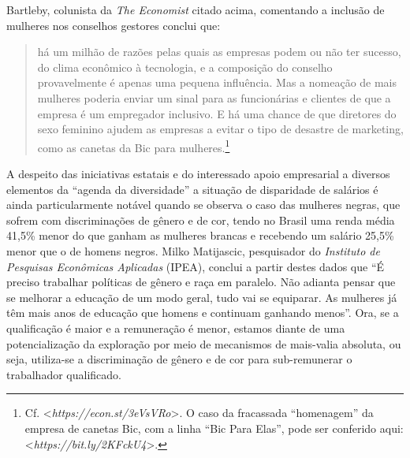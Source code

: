 Bartleby, colunista da \emph{The Economist} citado acima, comentando a
inclusão de mulheres nos conselhos gestores conclui que:

\begin{quote}
há um milhão de razões pelas quais as empresas podem ou não ter sucesso,
do clima econômico à tecnologia, e a composição do conselho
provavelmente é apenas uma pequena influência. Mas a nomeação de mais
mulheres poderia enviar um sinal para as funcionárias e clientes de que
a empresa é um empregador inclusivo. E há uma chance de que diretores do
sexo feminino ajudem as empresas a evitar o tipo de desastre de
marketing, como as canetas da Bic para mulheres.\footnote{Cf.
  \textless{}\emph{https://econ.st/3eVsVRo}\textgreater{}.
  O caso da fracassada ``homenagem'' da empresa de canetas Bic, com a
  linha ``Bic Para Elas'', pode ser conferido aqui:
  \textless{}\emph{https://bit.ly/2KFckU4}\textgreater{}.}
\end{quote}

A despeito das iniciativas estatais e do interessado apoio empresarial a
diversos elementos da ``agenda da diversidade'' a situação de
disparidade de salários é ainda particularmente notável quando se
observa o caso das mulheres negras, que sofrem com discriminações de
gênero e de cor, tendo no Brasil uma renda média 41,5\% menor do que
ganham as mulheres brancas e recebendo um salário 25,5\% menor que o de
homens negros. Milko Matijascic, pesquisador do \emph{Instituto de
Pesquisas Econômicas Aplicadas} (IPEA), conclui a partir destes dados
que ``É preciso trabalhar políticas de gênero e raça em paralelo. Não
adianta pensar que se melhorar a educação de um modo geral, tudo vai se
equiparar. As mulheres já têm mais anos de educação que homens e
continuam ganhando menos''. Ora, se a qualificação é maior e a
remuneração é menor, estamos diante de uma potencialização da exploração
por meio de mecanismos de mais-valia absoluta, ou seja, utiliza-se a
discriminação de gênero e de cor para sub-remunerar o trabalhador
qualificado.


